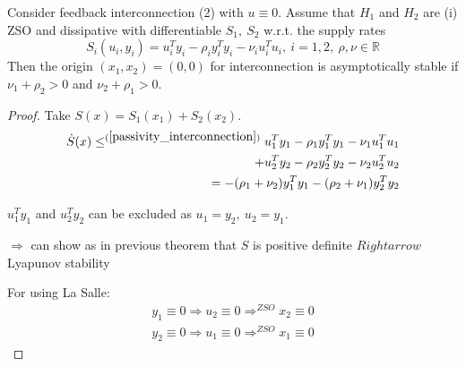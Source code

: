 \begin{Theorem}
Consider feedback interconnection (2) with $u \equiv 0$. Assume that $H_1$ and $H_2$ are (i) ZSO and dissipative with differentiable $S_1, \ S_2$ w.r.t. the supply rates
\begin{equation}\label{passivity_interconnection}
S_i(u_i,y_i) = u_i^Ty_i - \rho_iy_i^Ty_i - \nu_iu_i^Tu_i, \ i=1,2, \ \rho,\nu \in \mathbb{R}
\end{equation}
Then the origin $(x_1,x_2) = (0,0)$ for interconnection is asymptotically stable if $\nu_1 + \rho_2 > 0$ and $\nu_2 + \rho_1 > 0$.
\begin{proof}
Take $S(x) = S_1(x_1)+S_2(x_2)$.
\begin{equation*}
\begin{split}
\dot{S}(x) \leq^{(\ref{passivity_interconnection})} u_1^Ty_1 - \rho_1 y_1^Ty_1 - \nu_1u_1^Tu_1 \\
+ u_2^Ty_2 - \rho_2y_2^Ty_2 - \nu_2u_2^Tu_2 \\
= - (\rho_1 + \nu_2)y_1^Ty_1 - (\rho_2 +\nu_1)y_2^Ty_2
\end{split}
\end{equation*}

$u_1^Ty_1$ and $u_2^Ty_2$ can be excluded as $u_1=y_2, \ u_2 = y_1$. 

$\Rightarrow$ can show as in previous theorem that $S$ is positive definite $Rightarrow$ Lyapunov stability

For using La Salle:
\begin{equation*}
\begin{split}
y_1 \equiv 0 \Rightarrow u_2 \equiv 0 \Rightarrow^{ZSO} x_2 \equiv 0 \\
y_2 \equiv 0 \Rightarrow u_1 \equiv 0 \Rightarrow^{ZSO} x_1 \equiv 0
\end{split}
\end{equation*}
\end{proof}
\end{Theorem}